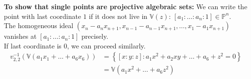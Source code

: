 \documentclass[a4paper]{article}
\begin{document}
\textbf{To show that single points are projective algebraic sets:} 
We can write the point with last coordinate $1$ if it does not live in
$\mathbb{V}(z)$: $\left[ a_1 : \ldots : a_n : 1 \right] \in \mathbb{P}^{n}$.\\
The homogeneous ideal
$\left( x_n - a_n x_{n+1}, x_{n-1}-a_{n-1} x_{n+1}, \ldots
, x_1 - a_1 x_{n+1} \right) $
vanishes at $\left[ a_1 : \ldots : a_n : 1 \right] $ precisely.\\
If last coordinate is $0$, we can proceed similarly.\\
\linebreak
\begin{align*}
    v_{2,2}^{-1} \left( \mathbb{V}\left( a_1 x_1 + \ldots + 
    a_6 x_{6} \right)  \right) 
    &= \left\{ \left[ x:y:z \right]  \colon
    a_1 x^2 + a_2 xy + \ldots + a_6 + z^2 = 0 \right\} \\
    &= \mathbb{V} \left( a_1 x^2 + \ldots + a_6 z^{2} \right) 
\end{align*}
\end{document}
